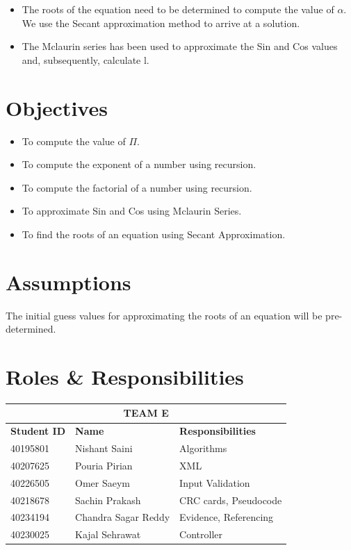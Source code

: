 \documentclass{report}
\begin{document}
  \vspace*{20pt}
  
  \begin{itemize}
    \item {The roots of the equation need to be determined to compute the value of $\alpha$. We use the Secant approximation method to arrive at a solution.}
    \item {The Mclaurin series has been used to approximate the Sin and Cos values and, subsequently, calculate l.}
  \end{itemize}

\section{Objectives}
\begin{itemize}
  \item To compute the value of $\Pi$.
  \item To compute the exponent of a number using recursion.
  \item To compute the factorial of a number using recursion.
  \item To approximate Sin and Cos using Mclaurin Series.
  \item To find the roots of an equation using Secant Approximation.
\end{itemize}

\section{Assumptions}
  The initial guess values for approximating the roots of an equation will be pre-determined.

\section{Roles \& Responsibilities}
  \begin{center}
    \begin{tabular}{ |p{4cm}|p{4cm}|p{4cm}|  }
      \hline
      \multicolumn{3}{|c|}{\textbf{TEAM E}} \\
      \hline
      \textbf{Student ID}& \textbf{Name} & \textbf{Responsibilities} \\
      \hline
      40195801 & Nishant Saini & Algorithms \\
      \hline
      40207625 & Pouria Pirian & XML \\
      \hline
      40226505 & Omer Saeym & Input Validation \\
      \hline
      40218678 & Sachin Prakash & CRC cards, Pseudocode \\
      \hline
      40234194 & Chandra Sagar Reddy & Evidence, Referencing \\
      \hline
      40230025 & Kajal Sehrawat & Controller   \\
      \hline
      \end{tabular}
  \end{center}
\end{document}
